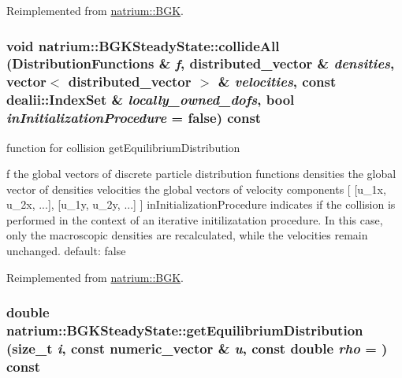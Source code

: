Reimplemented from \hyperlink{classnatrium_1_1BGK_a430f5020b6101a64d89a0cc2a246260e}{natrium::BGK}.\hypertarget{classnatrium_1_1BGKSteadyState_a8554fb624c5a3abe01651747b3d9aeb7}{
\subsubsection[{collideAll}]{\setlength{\rightskip}{0pt plus 5cm}void natrium::BGKSteadyState::collideAll ({\bf DistributionFunctions} \& {\em f}, \/  {\bf distributed\_\-vector} \& {\em densities}, \/  vector$<$ {\bf distributed\_\-vector} $>$ \& {\em velocities}, \/  const dealii::IndexSet \& {\em locally\_\-owned\_\-dofs}, \/  bool {\em inInitializationProcedure} = {\ttfamily false}) const}}
\label{classnatrium_1_1BGKSteadyState_a8554fb624c5a3abe01651747b3d9aeb7}


function for collision getEquilibriumDistribution

f the global vectors of discrete particle distribution functions densities the global vector of densities velocities the global vectors of velocity components \mbox{[} \mbox{[}u\_\-1x, u\_\-2x, ...\mbox{]}, \mbox{[}u\_\-1y, u\_\-2y, ...\mbox{]} \mbox{]} inInitializationProcedure indicates if the collision is performed in the context of an iterative initilizatation procedure. In this case, only the macroscopic densities are recalculated, while the velocities remain unchanged. default: false 

Reimplemented from \hyperlink{classnatrium_1_1BGK_a9fa1c980217a183fc4762954e86ba36d}{natrium::BGK}.\hypertarget{classnatrium_1_1BGKSteadyState_ad99d9159cc14b5897bea7f145c3b39ca}{
\subsubsection[{getEquilibriumDistribution}]{\setlength{\rightskip}{0pt plus 5cm}double natrium::BGKSteadyState::getEquilibriumDistribution (size\_\-t {\em i}, \/  const {\bf numeric\_\-vector} \& {\em u}, \/  const double {\em rho} = {}) const}}
\label{classnatrium_1_1BGKSteadyState_ad99d9159cc14b5897bea7f145c3b39ca}


